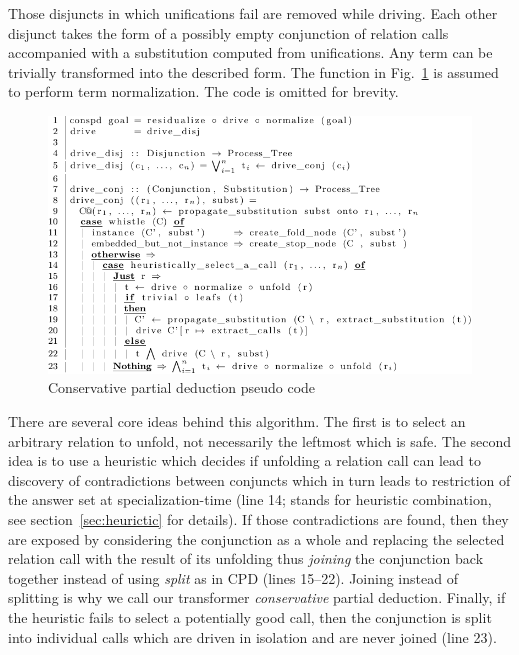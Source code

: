 Those disjuncts in which unifications fail are removed while driving.
Each other disjunct takes the form of a possibly empty conjunction of relation calls accompanied with a substitution computed from unifications.
Any \mk term can be trivially transformed into the described form.
The function  in Fig.~\ref{fig:ncpd-pseudo} is assumed to perform term normalization.
The code is omitted for brevity.

\begin{figure}[!t]
  \centering
  \includegraphics[width=\textwidth]{figures/algo-pseudo-crop.pdf}
  \caption{Conservative partial deduction pseudo code}
  \label{fig:ncpd-pseudo}
\end{figure}


There are several core ideas behind this algorithm.
The first is to select an arbitrary relation to unfold, not necessarily the leftmost which is safe.
The second idea is to use a heuristic which decides if unfolding a relation call can lead to discovery of contradictions between conjuncts which in turn leads to restriction of the answer set at specialization-time (line 14;  stands for heuristic combination, see section~\ref{sec:heurictic} for details).
If those contradictions are found, then they are exposed by considering the conjunction as a whole and replacing the selected relation call with the result of its unfolding thus \emph{joining} the conjunction back together instead of using \emph{split} as in CPD (lines 15--22).
Joining instead of splitting is why we call our transformer \emph{conservative} partial deduction.
Finally, if the heuristic fails to select a potentially good call, then the conjunction is split into individual calls which are driven in isolation and are never joined (line 23).


